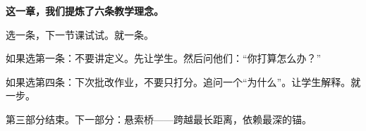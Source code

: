 \vspace{1cm}

\begin{decision-point}
\label{decision:chap9}

\noindent\textbf{这一章，我们提炼了六条教学理念。}

\vspace{0.3cm}

\noindent 选一条，下一节课试试。就一条。

\noindent 如果选第一条：不要讲定义。先让学生\noindent。然后问他们：``你打算怎么办？''

\noindent 如果选第四条：下次批改作业，不要只打分。追问一个``为什么''。让学生解释\noindent。就一步。
\end{decision-point}

\vspace{0.5cm}

\begin{flushright}
{\small\color{muted} 第三部分结束。下一部分：悬索桥——跨越最长距离，依赖最深的锚。}
\end{flushright}
